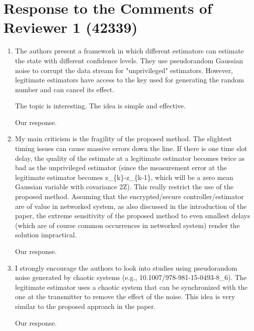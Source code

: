 \documentclass[a4paper]{scrartcl}
\newenvironment{rebuttal}{\begin{enumerate}[label={\color{grey}\thesection.\arabic{enumi}},leftmargin=0pt,ref=\thesection.\arabic{enumi}]}{\end{enumerate}}
\newcommand{\reviewtext}[1]{{\color{nblue} #1}}
\begin{document}
\section*{Response to the Comments of Reviewer 1 (42339)}
\def\thesection{R1}
\begin{rebuttal}
\item \reviewtext{The authors present a framework in which different estimators can estimate the state with different confidence levels. They use pseudorandom Gaussian noise to corrupt the data stream for "unprivileged" estimators. However, legitimate estimators have access to the key used for generating the random number and can cancel its effect. 

The topic is interesting. The idea is simple and effective.}

Our response.

\item \reviewtext{My main criticism is the fragility of the proposed method. The slightest timing issues can cause massive errors down the line. If there is one time slot delay, the quality of the estimate at a legitimate estimator becomes twice as bad as the unprivileged estimator (since the measurement error at the legitimate estimator becomes z\_\{k\}-z\_\{k-1\}, which will be a zero mean Gaussian variable with covariance 2Z). This really restrict the use of the proposed method. Assuming that the encrypted/secure controller/estimator are of value in networked system, as also discussed in the introduction of the paper, the extreme sensitivity of the proposed method to even smallest delays (which are of course common occurrences in networked system) render the solution impractical.}

Our response.

\item \reviewtext{I strongly encourage the authors to look into studies using pseudorandom noise generated by chaotic systems (e.g., 10.1007/978-981-15-0493-8\_6). The legitimate estimator uses a chaotic system that can be synchronized with the one at the transmitter to remove the effect of the noise. This idea is very similar to the proposed approach in the paper.}

Our response.

\end{rebuttal}

\end{document}
